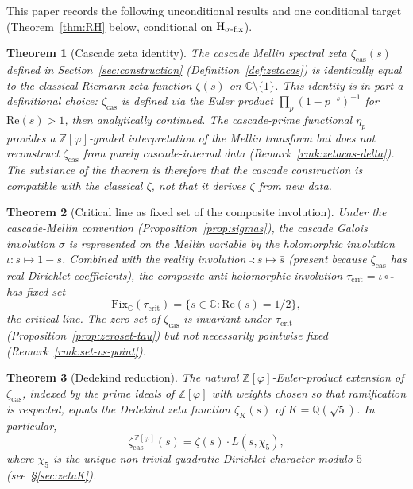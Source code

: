 \documentclass[11pt, a4paper]{amsart}
\newtheorem{theorem}{Theorem}[section]
\theoremstyle{definition}
\newcommand{\Z}{\mathbb{Z}}
\newcommand{\Q}{\mathbb{Q}}
\newcommand{\C}{\mathbb{C}}
\newcommand{\pphi}{\varphi}
\newcommand{\zetacas}{\zeta_{\mathrm{cas}}}
\begin{document}
This paper records the following unconditional results and one
conditional target (Theorem~\ref{thm:RH} below, conditional on
$\textup{H}_{\sigma\text{-fix}}$).

\begin{theorem}[Cascade zeta identity]\label{thm:casczeta}
The cascade Mellin spectral zeta $\zetacas(s)$ defined in
Section~\ref{sec:construction} (Definition~\ref{def:zetacas}) is
identically equal to the classical Riemann zeta function $\zeta(s)$
on $\C \setminus \{1\}$.  This identity is in part a definitional
choice: $\zetacas$ is \emph{defined} via the Euler product
$\prod_p (1-p^{-s})^{-1}$ for $\mathrm{Re}(s) > 1$, then analytically
continued.  The cascade-prime functional $\eta_p$ provides a
$\Z[\pphi]$-graded interpretation of the Mellin transform but does
\emph{not} reconstruct $\zetacas$ from purely cascade-internal data
(Remark~\ref{rmk:zetacas-delta}).  The substance of the theorem is
therefore that the cascade construction is \emph{compatible} with
the classical $\zeta$, not that it derives $\zeta$ from new data.
\end{theorem}

\begin{theorem}[Critical line as fixed set of the composite involution]\label{thm:critline}
Under the cascade-Mellin convention
(Proposition~\ref{prop:sigmas}), the cascade Galois involution
$\sigma$ is represented on the Mellin variable by the holomorphic
involution $\iota: s \mapsto 1-s$. Combined with the
reality involution $\bar{\ }: s \mapsto \bar{s}$ (present because
$\zetacas$ has real Dirichlet coefficients), the composite
anti-holomorphic involution $\tau_{\mathrm{crit}} = \iota \circ \bar{\ }$ has
fixed set
\[
\mathrm{Fix}_\C(\tau_{\mathrm{crit}}) = \{s \in \C : \mathrm{Re}(s) = 1/2\},
\]
the critical line. The zero set of $\zetacas$ is invariant under
$\tau_{\mathrm{crit}}$ (Proposition~\ref{prop:zeroset-tau}) but not necessarily
pointwise fixed (Remark~\ref{rmk:set-vs-point}).
\end{theorem}

\begin{theorem}[Dedekind reduction]\label{thm:dedekind}
The natural $\Z[\pphi]$-Euler-product extension of $\zetacas$,
indexed by the prime ideals of $\Z[\pphi]$ with weights chosen so
that ramification is respected, equals the Dedekind zeta function
$\zeta_K(s)$ of $K = \Q(\sqrt{5})$. In particular,
\[
\zetacas^{\,\Z[\pphi]}(s) = \zeta(s) \cdot L(s, \chi_5),
\]
where $\chi_5$ is the unique non-trivial \emph{quadratic} Dirichlet character modulo
$5$ (see~\S\ref{sec:zetaK}).
\end{theorem}
\end{document}

